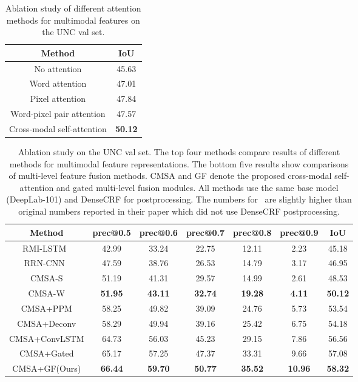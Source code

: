 \documentclass[10pt,twocolumn,letterpaper]{article}
\begin{document}
 \begin{table}[ht!]
\begin{center}
\begin{tabular}{|c|c|}
\hline
Method  & IoU \\
\hline  
No attention &  45.63    \\
Word attention  & 47.01  \\
Pixel attention   &   47.84 \\ 
Word-pixel pair attention & 47.57  \\
Cross-modal self-attention & {\bf 50.12} \\
\hline
\end{tabular}
\end{center}
\caption{Ablation study of different attention methods for multimodal features on the UNC val set.}
\label{tab:ab_att}
\end{table} \begin{table*}[ht!]
\begin{center}
\begin{tabular}{|c|c|c|c|c|c|c|}
\hline
    Method &  prec@0.5 & prec@0.6 &  prec@0.7  & prec@0.8 &  prec@0.9 & IoU\\
\hline
    RMI-LSTM~\cite{liu2017recurrent} & 42.99  & 33.24 & 22.75 & 12.11 & 2.23& 45.18   \\
    RRN-CNN~\cite{li2018referring}  &  47.59 & 38.76 & 26.53 & 14.79 & 3.17 & 46.95   \\
    CMSA-S  & 51.19  & 41.31 & 29.57 & 14.99 & 2.61 & 48.53   \\
    CMSA-W  & \bf{51.95}  &\bf{43.11} & \bf{32.74} & \bf{19.28} & \bf{4.11} & \bf{50.12}   \\
\hline
    CMSA+PPM  & 58.25  & 49.82 & 39.09 & 24.76 & 5.73 & 53.54   \\
    CMSA+Deconv  & 58.29  & 49.94 & 39.16 & 25.42 & 6.75 & 54.18 \\
    CMSA+ConvLSTM  & 64.73  & 56.03 & 45.23 & 29.15 & 7.86 & 56.56   \\
    CMSA+Gated  & 65.17  & 57.25 & 47.37 & 33.31 & 9.66 &  57.08  \\ 
    CMSA+GF(Ours)  & \bf{66.44}  & \bf{59.70} & \bf{50.77} & \bf{35.52} & \bf{10.96} & \bf{58.32}  \\
    
\hline
\end{tabular}
\end{center}
\caption{Ablation study on the UNC val set. The top four methods compare results of different methods for multimodal feature representations. The bottom five results show comparisons of multi-level feature fusion methods. CMSA and GF denote the proposed cross-modal self-attention and gated multi-level fusion modules. All methods use the same base model (DeepLab-101) and DenseCRF for postprocessing. The numbers for~\cite{li2018referring} are slightly higher than original numbers reported in their paper which did not use DenseCRF postprocessing.}
\label{tab:ab}
\end{table*}
\end{document}
